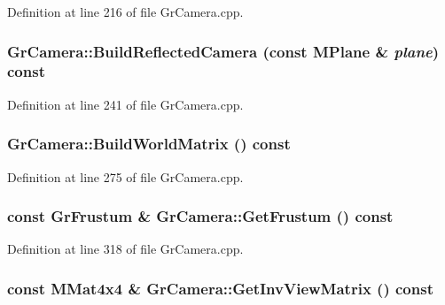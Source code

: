 Definition at line 216 of file GrCamera.cpp.\hypertarget{class_gr_camera_582cf3fc4ef7a58ede09464e80f05ade}{
\subsubsection[{BuildReflectedCamera}]{ GrCamera::BuildReflectedCamera (const {\bf MPlane} \& {\em plane}) const}}
\label{class_gr_camera_582cf3fc4ef7a58ede09464e80f05ade}




Definition at line 241 of file GrCamera.cpp.\hypertarget{class_gr_camera_fbfe693f3ba2ae3b77de5c6886f72631}{
\subsubsection[{BuildWorldMatrix}]{ GrCamera::BuildWorldMatrix () const}}
\label{class_gr_camera_fbfe693f3ba2ae3b77de5c6886f72631}




Definition at line 275 of file GrCamera.cpp.\hypertarget{class_gr_camera_2ac192689362a2d6227aaae330f08473}{
\subsubsection[{GetFrustum}]{\setlength{\rightskip}{0pt plus 5cm}const {\bf GrFrustum} \& GrCamera::GetFrustum () const}}
\label{class_gr_camera_2ac192689362a2d6227aaae330f08473}




Definition at line 318 of file GrCamera.cpp.\hypertarget{class_gr_camera_b8bc71a443e47f9a2accb9c1106ee9e7}{
\subsubsection[{GetInvViewMatrix}]{\setlength{\rightskip}{0pt plus 5cm}const {\bf MMat4x4} \& GrCamera::GetInvViewMatrix () const}}
\label{class_gr_camera_b8bc71a443e47f9a2accb9c1106ee9e7}





